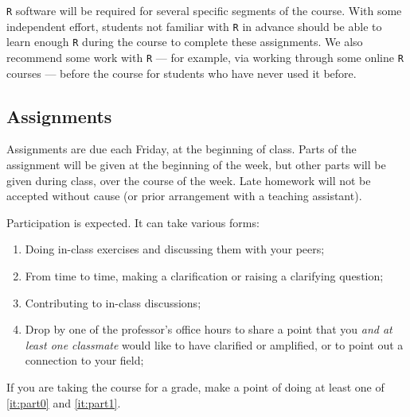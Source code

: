 \documentclass[12pt]{article}
\begin{document}
\texttt{R} software will be required for several specific segments of the course. With some independent effort, students not familiar with \texttt{R} in advance should be able to learn enough \texttt{R} during the course to complete these assignments. We also recommend some work with \texttt{R} --- for example, via working through some online \texttt{R} courses --- before the course for students who have never used it before.

\subsection*{Assignments}
Assignments are due each Friday, at the beginning of
class. Parts of the assignment will be given at the beginning of the week, but other parts will be given during class, over the course of the week.  Late homework will not be accepted without cause (or prior arrangement with a teaching assistant).

Participation is expected. It can take various forms:
\begin{enumerate}
\item Doing in-class exercises and discussing them with your peers;
\item From time to time, making a clarification or raising a clarifying question;
\item \label{it:part0} Contributing to in-class discussions;
\item \label{it:part1} Drop by one of the professor's office hours to share a point that you \textit{and at least one classmate} would like to have clarified or amplified, or to point out a connection to your field;
\end{enumerate}
If you are taking the course for a grade, make a point of doing at
least one of \ref{it:part0} and \ref{it:part1}.
\end{document}
